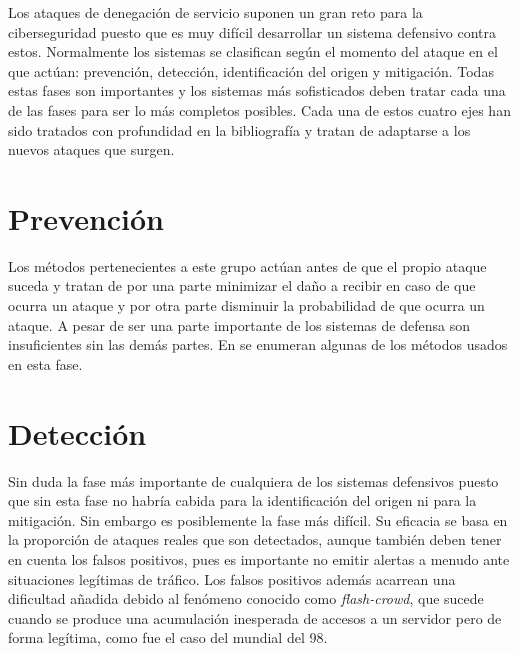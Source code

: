 Los ataques de denegación de servicio suponen un gran reto para la ciberseguridad puesto que es muy difícil desarrollar un sistema defensivo contra estos. Normalmente los sistemas se clasifican según el momento del ataque en el que actúan: prevención, detección, identificación del origen y mitigación. Todas estas fases son importantes y los sistemas más sofisticados deben tratar cada una de las fases para ser lo más completos posibles. Cada una de estos cuatro ejes han sido tratados con profundidad en la bibliografía y tratan de adaptarse a los nuevos ataques que surgen. 

\section{Prevención}
Los métodos pertenecientes a este grupo actúan antes de que el propio ataque suceda y tratan de por una parte minimizar el da\~no a recibir en caso de que ocurra un ataque y por otra parte disminuir la probabilidad de que ocurra un ataque. A pesar de ser una parte importante de los sistemas de defensa son insuficientes sin las demás partes. En \cite{zargar:2013} se enumeran algunas de los métodos usados en esta fase. 

\section{Detección}
Sin duda la fase más importante de cualquiera de los sistemas defensivos puesto que sin esta fase no habría cabida para la identificación del origen ni para la mitigación. Sin embargo es posiblemente la fase más difícil. Su eficacia se basa en la proporción de ataques reales que son detectados, aunque también deben tener en cuenta los falsos positivos, pues es importante no emitir alertas a menudo ante situaciones legítimas de tráfico. Los falsos positivos además acarrean una dificultad a\~nadida debido al fenómeno conocido como \textit{flash-crowd}, que sucede cuando se produce una acumulación inesperada de accesos a un servidor pero de forma legítima, como fue el caso del mundial del 98\cite{detection:2014}. \\

